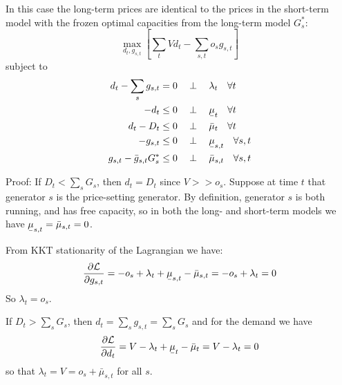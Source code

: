 \documentclass[final,3p,times]{elsarticle}
\newcommand{\ubar}[1]{\text{\b{$#1$}}}
\def\l{\lambda}
\def\d{\partial}
\def\cL{\mathcal{L}}
\begin{document}
In this case the long-term prices are identical to the prices in the short-term model with the frozen optimal capacities from the long-term model $G_{s}^*$:
\begin{equation}
    \max_{d_{t}, g_{s,t}}\left[\sum_{t} V d_{t}  - \sum_{s,t} o_{s} g_{s,t} \right]  \label{eq:objs}
\end{equation}
subject to
\begin{align}
   d_{t} - \sum_s g_{s,t} & =  0 \hspace{0.34cm}\perp \hspace{0.34cm} \l_t \hspace{0.34cm} \forall t \label{eq:balance2}\\
    -d_{t} & \leq 0 \hspace{0.34cm}\perp \hspace{0.34cm} \ubar{\mu}_{t} \hspace{0.34cm} \forall t  \nonumber \\
    d_{t} - D_{t} & \leq 0 \hspace{0.34cm}\perp \hspace{0.34cm} \bar{\mu}_{t} \hspace{0.34cm} \forall t\nonumber  \\
    -g_{s,t} & \leq 0 \hspace{0.34cm}\perp \hspace{0.34cm} \ubar{\mu}_{s,t} \hspace{0.34cm} \forall s,t \nonumber \\
         g_{s,t} - \bar{g}_{s,t} G^*_s & \leq 0 \hspace{0.34cm}\perp \hspace{0.34cm} \bar{\mu}_{s,t} \hspace{0.34cm} \forall s,t \label{eq:generation}
\end{align}

Proof: If $D_t < \sum_s G_{s}$, then $d_t = D_t$ since $V >> o_s$. Suppose at time $t$ that generator $s$ is the price-setting generator. By definition, generator $s$ is both running, and has free capacity, so in both the long- and short-term models we have $\ubar{\mu}_{s,t} = \bar{\mu}_{s,t} = 0$.

From KKT stationarity of the Lagrangian we have:
\begin{align}
\frac{\d \cL}{\d g_{s,t}} =  -o_s + \l_t + \ubar{\mu}_{s,t} - \bar{\mu}_{s,t}  =  -o_s + \l_t = 0
\end{align}
So $\l_t = o_s$.

If $D_t > \sum_s G_{s}$, then $d_t = \sum_s g_{s,t} = \sum_s G_{s}$ and for the demand we have
\begin{align}
\frac{\d \cL}{\d d_{t}} =  V -\l_t + \ubar{\mu}_{t} - \bar{\mu}_{t}  =  V - \l_t = 0
\end{align}
so that $\l_t = V = o_s + \bar{\mu}_{s,t}$ for all $s$.
\end{document}
